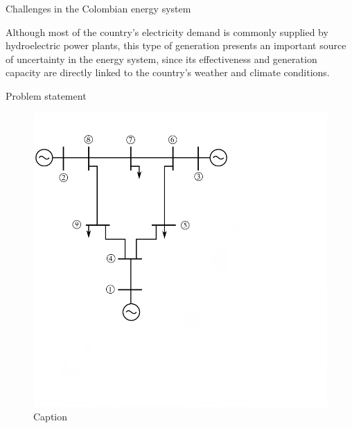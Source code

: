 \documentclass[hyperref={colorlinks,citecolor=blue,linkcolor=blue,urlcolor=blue}]{beamer}
\begin{document}
\begin{frame}{Challenges in the Colombian energy system}
    
    Although most of the country's electricity demand is commonly supplied by hydroelectric power plants, this type of generation presents an important source of uncertainty in the energy system, since its effectiveness and generation capacity are directly linked to the country's weather and climate conditions.

\end{frame}

\begin{frame}{Problem statement}
\begin{figure}
    \centering
    \includegraphics[scale=0.6]{figures/only_power.pdf}
    \caption{Caption}
    \label{fig:only_power}
\end{figure}
\end{frame}
\end{document}
